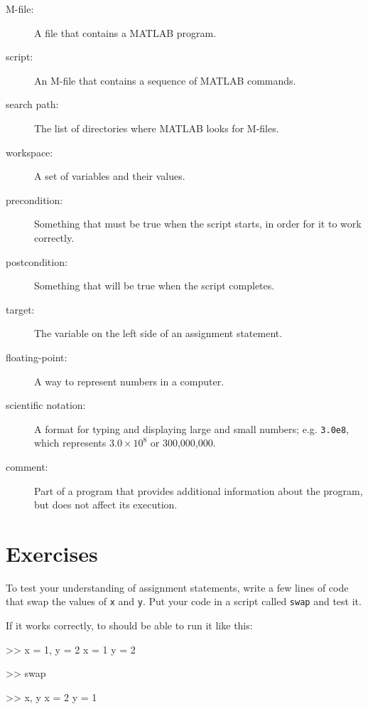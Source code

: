 \documentclass[
]{book}
\numberwithin{Answer}{chapter}
\numberwithin{Exercise}{chapter}
\begin{document}
\begin{description}

\item[M-file:] A file that contains a MATLAB program.

\item[script:] An M-file that contains a sequence of MATLAB commands.

\item[search path:] The list of directories where MATLAB looks for
M-files.

\item[workspace:] A set of variables and their values.

\item[precondition:] Something that must be true when the script
starts, in order for it to work correctly.

\item[postcondition:] Something that will be true when the script
completes.

\item[target:] The variable on the left side of an assignment statement.


\item[floating-point:] A way to represent numbers in a computer.

\item[scientific notation:] A format for typing and displaying large
and small numbers; e.g. {\tt 3.0e8}, which represents $3.0 \times 10^8$
or 300,000,000.

\item[comment:] Part of a program that provides additional information
about the program, but does not affect its execution.

\end{description}


\section{Exercises}



\begin{ex}
To test your understanding of assignment statements, write a few lines of code that swap the values of {\tt x} and {\tt y}. 
Put your code in a script called {\tt swap} and test it.

If it works correctly, to should be able to run it like this:

\begin{code}
>> x = 1, y = 2
x = 1
y = 2

>> swap

>> x, y
x = 2
y = 1
\end{code}


\end{ex}
\end{document}
